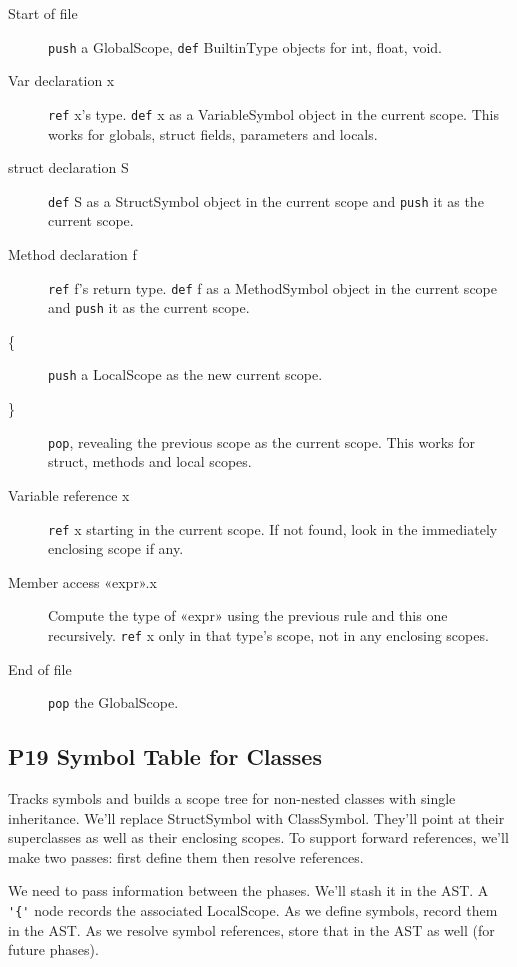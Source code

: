 \begin{description}
\item[Start of file]
\verb=push= a GlobalScope, \verb=def= BuiltinType objects for int, float, void.

\item[Var declaration x]
\verb=ref= x's type.
\verb=def= x as a VariableSymbol object in the current scope.
This works for globals, struct fields, parameters and locals.

\item[struct declaration S]
\verb=def= S as a StructSymbol object in the current scope
and \verb=push= it as the current scope.

\item[Method declaration f]
\verb=ref= f's return type.
\verb=def= f as a MethodSymbol object in the current scope
and \verb=push= it as the current scope.

\item[\{]
\verb=push= a LocalScope as the new current scope.

\item[\}]
\verb=pop=, revealing the previous scope as the current scope.
This works for struct, methods and local scopes.

\item[Variable reference x]
\verb=ref= x starting in the current scope.
If not found, look in the immediately enclosing scope if any.

\item[Member access «expr».x]
Compute the type of «expr» using the previous rule and this one recursively.
\verb=ref= x only in that type's scope, not in any enclosing scopes.

\item[End of file]
\verb=pop= the GlobalScope.
\end{description}


\subsection{P19 Symbol Table for Classes}

Tracks symbols and builds a scope tree
for non-nested classes with single inheritance.
We'll replace StructSymbol with ClassSymbol.
They'll point at their superclasses as well as their enclosing scopes.
To support forward references, we'll make two passes:
first define them then resolve references.

We need to pass information between the phases.
We'll stash it in the AST.
A \verb='{'= node records the associated LocalScope.
As we define symbols, record them in the AST.
As we resolve symbol references, store that in the AST as well
(for future phases).

